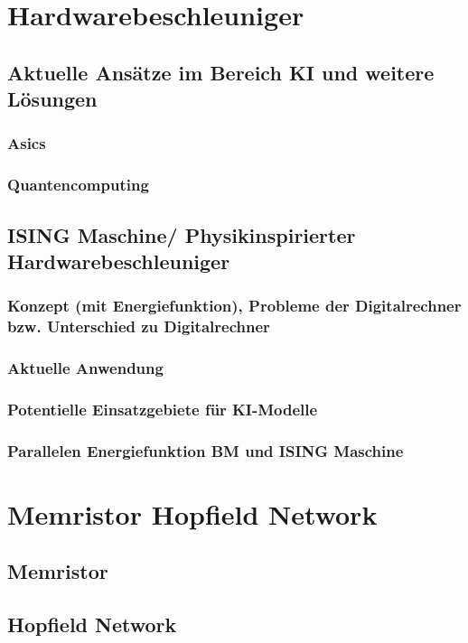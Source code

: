 \section{Hardwarebeschleuniger}
\subsection{Aktuelle Ansätze im Bereich KI und weitere Lösungen}
\subsubsection{Asics}
\subsubsection{Quantencomputing}
\subsection{ISING Maschine/ Physikinspirierter Hardwarebeschleuniger}
\subsubsection{Konzept (mit Energiefunktion), Probleme der Digitalrechner bzw. Unterschied zu Digitalrechner}
\subsubsection{Aktuelle Anwendung}
\subsubsection{Potentielle Einsatzgebiete für KI-Modelle}
\subsubsection{Parallelen Energiefunktion BM und ISING Maschine}

\section{Memristor Hopfield Network}
\subsection{Memristor}
\subsection{Hopfield Network}

